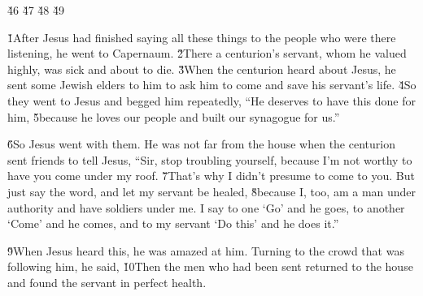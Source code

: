 \v{46} \v{47} \v{48} \v{49}

\v{1}After Jesus had finished saying all these things to the people who were there listening, he went to Capernaum. \v{2}There a centurion's servant, whom he valued highly, was sick and about to die. \v{3}When the centurion heard about Jesus, he sent some Jewish elders to him to ask him to come and save his servant's life. \v{4}So they went to Jesus and begged him repeatedly, ``He deserves to have this done for him, \v{5}because he loves our people and built our synagogue for us.''

\v{6}So Jesus went with them. He was not far from the house when the centurion sent friends to tell Jesus, ``Sir, stop troubling yourself, because I'm not worthy to have you come under my roof. \v{7}That's why I didn't presume to come to you. But just say the word, and let my servant be healed, \v{8}because I, too, am a man under authority and have soldiers under me. I say to one `Go' and he goes, to another `Come' and he comes, and to my servant `Do this' and he does it.''

\v{9}When Jesus heard this, he was amazed at him. Turning to the crowd that was following him, he said,  \v{10}Then the men who had been sent returned to the house and found the servant in perfect health.

